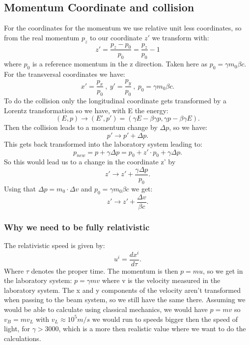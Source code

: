 \subsection{Momentum Coordinate and collision}
For the coordinates for the momentum we use relative unit less coordinates, so from the real momentum $p_z$ to our coordinate $z'$ we transform with:
\begin{equation} z' = \frac{p_z - p_{0}}{p_{0}} = \frac{p_z}{p_0} - 1 \end{equation}
where $p_{0}$ is a reference momentum in the z direction. Taken here as $p_{0} = \gamma m_0 \beta c$. For the transversal coordinates we have:
\begin{equation} x' = \frac{p_x}{p_0} \ , \ y' = \frac{p_y}{p_0} \ , \ p_0  = \gamma m_0 \beta c. \end{equation}
To do the collision only the longitudinal coordinate gets transformed by a Lorentz transformation so we have, with E the energy:
\begin{equation} (E, p) \rightarrow (E', p') = (\gamma E - \beta \gamma p, \gamma p - \beta \gamma E). \end{equation}
Then the collision leads to a momentum change by $\Delta p$, so we have:
\begin{equation} p' \rightarrow p' + \Delta p. \end{equation}
This gets back transformed into the laboratory system leading to:
\begin{equation} p_{new} = p + \gamma \Delta p = p_0 + z' \cdot p_0 + \gamma \Delta p.\end{equation}
So this would lead us to a change in the coordinate z' by
\begin{equation} z' \rightarrow z' + \frac{\gamma \Delta p}{p_0}. \end{equation}
Using that $\Delta p = m_0 \cdot \Delta v$ and $p_0 = \gamma m_0 \beta c$ we get:
\begin{equation} z' \rightarrow z' + \frac{\Delta v}{\beta c}. \end{equation}

\subsubsection{Why we need to be fully relativistic}
The relativistic speed is given by:
\begin{equation}u^i = \frac{dx^i}{d\tau}. \end{equation}
Where $\tau$ denotes the proper time. The momentum is then $p = m u$, so we get in the laboratory system: $p = \gamma m v$ where v is the velocity measured in the laboratory system. The x and y components of the velocity aren't transformed when passing to the beam system, so we still have the same there. Assuming we would be able to calculate using classical mechanics, we would have $p = m v$ so $v_B = m v_L$ with $v_L \approx 10^5 m / s$ we would run to speeds bigger then the speed of light, for $\gamma > 3000$, which is a more then realistic value where we want to do the calculations.

